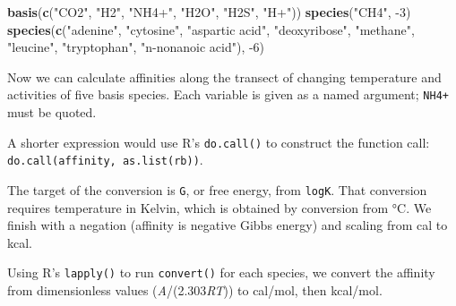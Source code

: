 \documentclass[]{tufte-book}
\newenvironment{Shaded}{}{}
\newcommand{\KeywordTok}[1]{\textcolor[rgb]{0.00,0.44,0.13}{\textbf{#1}}}
\newcommand{\DecValTok}[1]{\textcolor[rgb]{0.25,0.63,0.44}{#1}}
\newcommand{\StringTok}[1]{\textcolor[rgb]{0.25,0.44,0.63}{#1}}
\newcommand{\OperatorTok}[1]{\textcolor[rgb]{0.40,0.40,0.40}{#1}}
\newcommand{\NormalTok}[1]{#1}
\begin{document}
\begin{Shaded}
\begin{Highlighting}[]
\KeywordTok{basis}\NormalTok{(}\KeywordTok{c}\NormalTok{(}\StringTok{"CO2"}\NormalTok{, }\StringTok{"H2"}\NormalTok{, }\StringTok{"NH4+"}\NormalTok{, }\StringTok{"H2O"}\NormalTok{, }\StringTok{"H2S"}\NormalTok{, }\StringTok{"H+"}\NormalTok{))}
\KeywordTok{species}\NormalTok{(}\StringTok{"CH4"}\NormalTok{, }\OperatorTok{-}\DecValTok{3}\NormalTok{)}
\KeywordTok{species}\NormalTok{(}\KeywordTok{c}\NormalTok{(}\StringTok{"adenine"}\NormalTok{, }\StringTok{"cytosine"}\NormalTok{, }\StringTok{"aspartic acid"}\NormalTok{, }\StringTok{"deoxyribose"}\NormalTok{,}
          \StringTok{"methane"}\NormalTok{, }\StringTok{"leucine"}\NormalTok{, }\StringTok{"tryptophan"}\NormalTok{, }\StringTok{"n-nonanoic acid"}\NormalTok{), }\OperatorTok{-}\DecValTok{6}\NormalTok{)}
\end{Highlighting}
\end{Shaded}

Now we can calculate affinities along the transect of changing
temperature and activities of five basis species. Each variable is given
as a named argument; \texttt{NH4+} must be quoted.

\begin{marginfigure}
A shorter expression would use R's \texttt{do.call()} to construct the
function call:
\texttt{do.call(}{\texttt{affinity}}\texttt{,\ as.list(rb))}.
\end{marginfigure}\begin{marginfigure}
The target of the conversion is \texttt{G}, or free energy, from
\texttt{logK}. That conversion requires temperature in Kelvin, which is
obtained by conversion from °C. We finish with a negation (affinity is
negative Gibbs energy) and scaling from cal to kcal.
\end{marginfigure}

Using R's \texttt{lapply()} to run {\texttt{convert()}} for each
species, we convert the affinity from dimensionless values
(\emph{A}/(2.303\emph{RT})) to cal/mol, then kcal/mol.
\end{document}
